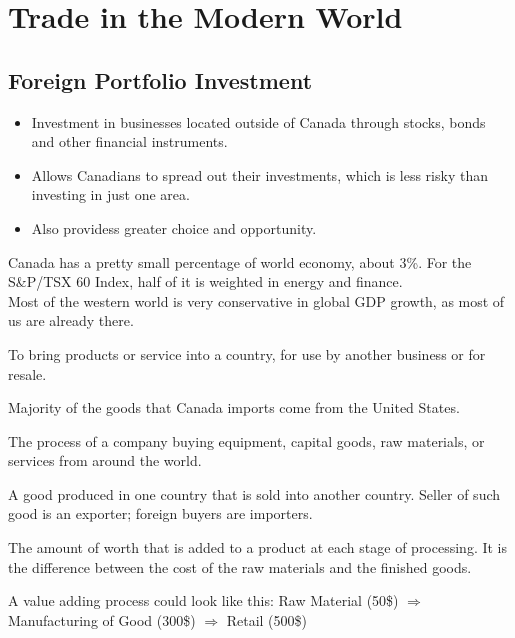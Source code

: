 
\chapter{Trade in the Modern World}

\section{Foreign Portfolio Investment}
\begin{itemize}
    \item Investment in businesses located outside of Canada through stocks, bonds
    and other financial instruments. 
    \item Allows Canadians to spread out their investments, which is less risky than
    investing in just one area. 
    \item Also providess greater choice and opportunity.
\end{itemize}

Canada has a pretty small percentage of world economy, about 3\%. 
For the S\&P/TSX 60 Index, half of it is weighted in energy and finance. \\
Most of the western world is very conservative in global GDP growth,
as most of us are already there. 

\begin{definition}[Importing]
    To bring products or service into a country,
    for use by another business or for resale.
\end{definition}

Majority of the goods that Canada imports 
come from the United States. 

\begin{definition}
    The process of a company buying equipment, 
    capital goods, raw materials, or services from around the world.
\end{definition}

\begin{definition}[Exporting]
    A good produced in one country that is sold into another 
    country. Seller of such good is an exporter; foreign buyers are importers.
\end{definition}

\begin{definition}
    The amount of worth that is added to a product at 
    each stage of processing. It is the difference between 
    the cost of the raw materials and the finished goods.
\end{definition}

A value adding process could look like this:
Raw Material (50\$) \(\Rightarrow\) Manufacturing of Good (300\$) \(\Rightarrow\) Retail (500\$)